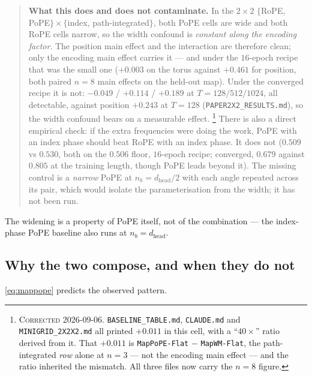 \documentclass[11pt]{article}
\newcommand{\hd}{d_{\mathrm{head}}}
\newcommand{\nb}{n_b}
\begin{document}
\begin{quote}\small
\textbf{What this does and does not contaminate.} In the $2\times2$
$\{$RoPE, PoPE$\}\times\{$index, path-integrated$\}$, both PoPE cells are wide and
both RoPE cells narrow, so the width confound is \emph{constant along the encoding
factor}. The position main effect and the interaction are therefore clean; only the
encoding main effect carries it --- and under the $16$-epoch recipe that was the small
one ($+0.003$ on the torus against $+0.461$ for position, both paired $n{=}8$ main
effects on the held-out map). Under the converged recipe it is not: $-0.049$ /
$+0.114$ / $+0.189$ at $T=128/512/1024$, all detectable, against position $+0.243$
at $T=128$ (\texttt{PAPER2X2\_RESULTS.md}), so the width confound bears on a
measurable effect.
\footnote{\textsc{Corrected 2026-09-06.} \texttt{BASELINE\_TABLE.md}, \texttt{CLAUDE.md}
and \texttt{MINIGRID\_2X2X2.md} all printed $+0.011$ in this cell, with a ``$40\times$''
ratio derived from it. That $+0.011$ is \texttt{MapPoPE-Flat} $-$ \texttt{MapWM-Flat},
the path-integrated \emph{row} alone at $n{=}3$ --- not the encoding main effect --- and
the ratio inherited the mismatch. All three files now carry the $n{=}8$ figure.} There is also a direct empirical check: if
the extra frequencies were doing the work, PoPE with an index phase should beat
RoPE with an index phase. It does not ($0.509$ vs $0.530$, both on the $0.506$
floor, $16$-epoch recipe; converged, $0.679$ against $0.805$ at the training length,
though PoPE leads beyond it). The missing control is a \emph{narrow} PoPE at $\nb = \hd/2$ with each
angle repeated across its pair, which would isolate the parameterisation from the
width; it has not been run.
\end{quote}

\noindent The widening is a property of PoPE itself, not of the combination ---
the index-phase PoPE baseline also runs at $\nb = \hd$.

\subsection{Why the two compose, and when they do not}

\eqref{eq:mappope} predicts the observed pattern.
\end{document}

